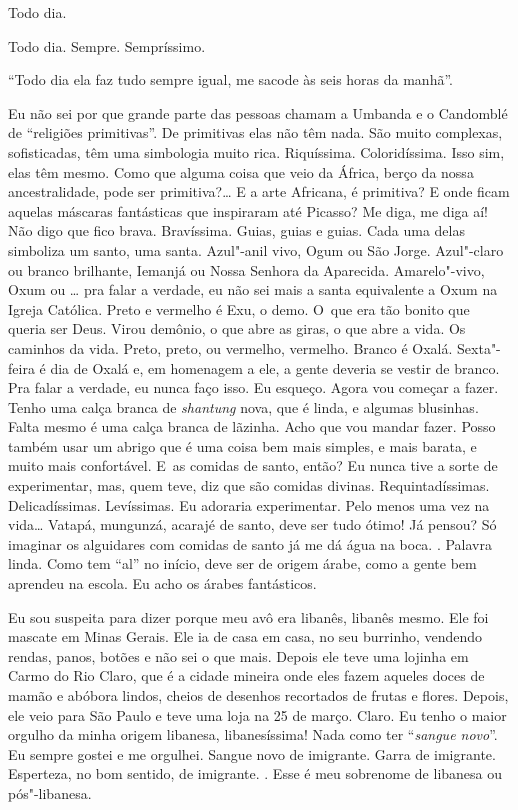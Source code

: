 Todo dia.

Todo dia. Sempre. Sempríssimo.

``Todo dia ela faz tudo sempre igual, me sacode às seis horas da
manhã''.

Eu não sei por que grande parte das pessoas chamam a Umbanda e o
Candomblé de ``religiões primitivas''. De primitivas elas não têm nada.
São muito complexas, sofisticadas, têm uma simbologia muito rica.
Riquíssima. Coloridíssima. Isso sim, elas têm mesmo. Como que alguma
coisa que veio da África, berço da nossa ancestralidade, pode ser
primitiva?… E a arte Africana, é primitiva? E onde ficam aquelas
máscaras fantásticas que inspiraram até Picasso? Me diga, me diga aí!
Não digo que fico brava. Bravíssima. Guias, guias e guias. Cada uma
delas simboliza um santo, uma santa. Azul"-anil vivo, Ogum ou São Jorge.
Azul"-claro ou branco brilhante, Iemanjá ou Nossa Senhora da Aparecida.
Amarelo"-vivo, Oxum ou … pra falar a verdade, eu não sei mais a
santa equivalente a Oxum na Igreja Católica. Preto e vermelho é Exu, o
demo. O~que era tão bonito que queria ser Deus. Virou demônio, o que
abre as giras, o que abre a vida. Os caminhos da vida. Preto, preto, ou
vermelho, vermelho. Branco é Oxalá. Sexta"-feira é dia de Oxalá e, em
homenagem a ele, a gente deveria se vestir de branco. Pra falar a
verdade, eu nunca faço isso. Eu esqueço. Agora vou começar a fazer.
Tenho uma calça branca de \emph{shantung} nova, que é linda, e algumas
blusinhas. Falta mesmo é uma calça branca de lãzinha. Acho que vou
mandar fazer. Posso também usar um abrigo que é uma coisa bem mais
simples, e mais barata, e muito mais confortável. E~as comidas de santo,
então? Eu nunca tive a sorte de experimentar, mas, quem teve, diz que
são comidas divinas. Requintadíssimas. Delicadíssimas. Levíssimas. Eu
adoraria experimentar. Pelo menos uma vez na vida… Vatapá,
mungunzá, acarajé de santo, deve ser tudo ótimo! Já pensou? Só imaginar
os alguidares com comidas de santo já me dá água na boca. .
Palavra linda. Como tem ``al'' no início, deve ser de origem árabe, como
a gente bem aprendeu na escola. Eu acho os árabes fantásticos.

Eu sou suspeita para dizer porque meu avô era libanês, libanês mesmo.
Ele foi mascate em Minas Gerais. Ele ia de casa em casa, no seu
burrinho, vendendo rendas, panos, botões e não sei o que mais. Depois
ele teve uma lojinha em Carmo do Rio Claro, que é a cidade mineira onde
eles fazem aqueles doces de mamão e abóbora lindos, cheios de desenhos
recortados de frutas e flores. Depois, ele veio para São Paulo e teve
uma loja na 25 de março. Claro. Eu tenho o maior orgulho da minha origem
libanesa, libanesíssima! Nada como ter ``\emph{sangue novo}''. Eu sempre
gostei e me orgulhei. Sangue novo de imigrante. Garra de imigrante.
Esperteza, no bom sentido, de imigrante. . Esse é meu sobrenome de
libanesa ou pós"-libanesa.

